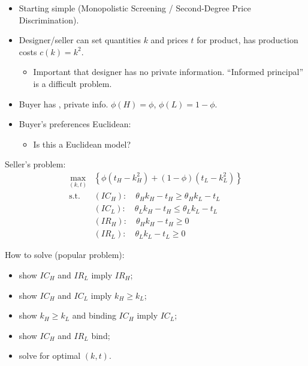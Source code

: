 \documentclass[english,handout,10pt]{beamer}		%
\def\lyxframeend{} %
\begin{document}
\begin{itemize}
	\item Starting simple (Monopolistic Screening / Second-Degree Price Discrimination).
	\item Designer/seller can set quantities $k$ and prices $t$ for product, has production costs $c(k) = k^2$.
	\pause[2]
	\begin{itemize}
		\item Important that designer has no private information. ``Informed principal'' is a difficult problem.
	\end{itemize}
	\pause[0]
	\item Buyer has , private info. $\phi(H) = \phi$, $\phi(L)=1-\phi$.
	\item Buyer's preferences Euclidean: 
	\begin{itemize}
		\item Is this a Euclidean model? %
	\end{itemize}
\end{itemize}
\lyxframeend


Seller's problem:
\vspace{-1em}\begin{align*}
	\max_{(k,t)} & \left\{ \phi (t_H - k_H^2) + (1-\phi) (t_L - k_L^2) \right\}
	\\ \text{s.t. } & (IC_H):\quad \theta_H k_H - t_H \geq \theta_H k_L - t_L
	\\ & (IC_L):\quad \theta_L k_H - t_H \leq \theta_L k_L - t_L
	\\ & (IR_H):\quad \theta_H k_H - t_H \geq 0
	\\ & (IR_L):\quad \theta_L k_L - t_L \geq 0
\end{align*}\vspace{-0.5em}

How to solve (popular problem):
\begin{itemize}[<+->]
	\item show $IC_H$ and $IR_L$ imply $IR_H$;
	\item show $IC_H$ and $IC_L$ imply $k_H \geq k_L$;
	\item show $k_H \geq k_L$ and binding $IC_H$ imply $IC_L$;
	\item show $IC_H$ and $IR_L$ bind;
	\item solve for optimal $(k,t)$.
\end{itemize}
\lyxframeend
\end{document}
